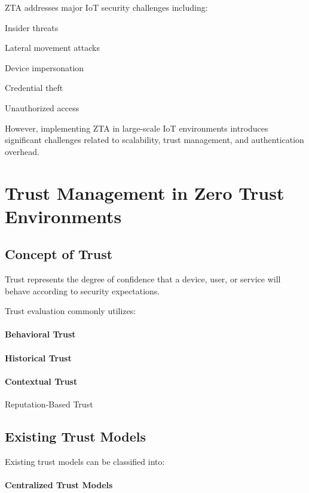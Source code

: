 ZTA addresses major IoT security challenges including:


Insider threats


Lateral movement attacks


Device impersonation


Credential theft


Unauthorized access


However, implementing ZTA in large-scale IoT environments introduces significant challenges related to scalability, trust management, and authentication overhead.


\section{Trust Management in Zero Trust Environments}

\subsection{Concept of Trust}

Trust represents the degree of confidence that a device, user, or service will behave according to security expectations.


Trust evaluation commonly utilizes:


\paragraph{Behavioral Trust}

\paragraph{Historical Trust}

\paragraph{Contextual Trust}

Reputation-Based Trust


\subsection{Existing Trust Models}

Existing trust models can be classified into:


\paragraph{Centralized Trust Models}

